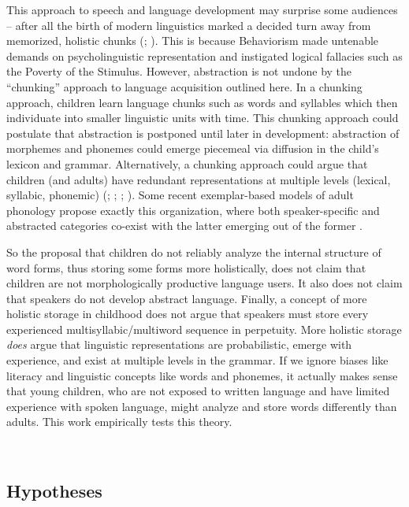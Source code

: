 \documentclass[a4paper,man,floatsintext,natbib,donotrepeattitle, apacite]{apa6}
\begin{document}
This approach to speech and language development may surprise some audiences – after all the birth of modern linguistics marked a decided turn away from memorized, holistic chunks (\citealt{chomskyReviewBFSkinner1959}; \citealt{skinnerVerbalBehavior1957}). This is because Behaviorism made untenable demands on psycholinguistic representation and instigated logical fallacies such as the Poverty of the Stimulus. However, abstraction is not undone by the “chunking” approach to language acquisition outlined here. In a chunking approach, children learn language chunks such as words and syllables which then individuate into smaller linguistic units with time. This chunking approach could postulate that abstraction is postponed until later in development: abstraction of morphemes and phonemes could emerge piecemeal via diffusion in the child's lexicon and grammar. Alternatively, a chunking approach could argue that children (and adults) have redundant representations at multiple levels (lexical, syllabic, phonemic) (\citealt{arnonRoleMultiwordBuilding2017}; \citealt{arnonMoreWordsEffect2013}; \citealt{arnonStartingBigRole2010}; \citealt{bannardStoredWordSequences2008}). Some recent exemplar-based models of adult phonology propose exactly this organization, where both speaker-specific and abstracted categories co-exist with the latter emerging out of the former \citep{pierrehumbertPhonologicalRepresentationAbstract2016}. 

So the proposal that children do not reliably analyze the internal structure of word forms, thus storing some forms more holistically, does not claim that children are not morphologically productive language users. It also does not claim that speakers do not develop abstract language. Finally, a concept of more holistic storage in childhood does not argue that speakers must store every experienced multisyllabic/multiword sequence in perpetuity. More holistic storage \textit{does} argue that linguistic representations are probabilistic, emerge with experience, and exist at multiple levels in the grammar. If we ignore biases like literacy and linguistic concepts like words and phonemes, it actually makes sense that young children, who are not exposed to written language and have limited experience with spoken language, might analyze and store words differently than adults. This work empirically tests this theory.

~
~

\subsection{Hypotheses}
\end{document}
